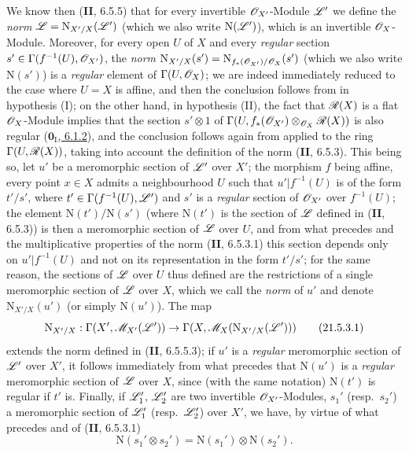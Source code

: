 \begin{env}[21.5.3]
We know then (\textbf{II}, 6.5.5) that for every invertible $\mathscr{O}_{X'}$-Module $\mathscr{L}'$ we define the \emph{norm} $\mathscr{L}=\mathrm{N}_{X'/X}(\mathscr{L}')$ (which we also write $\mathrm{N}(\mathscr{L}')$), which is an invertible $\mathscr{O}_X$-Module.
Moreover, for every open $U$ of $X$ and every \emph{regular} section $s'\in\Gamma(f^{-1}(U),\mathscr{O}_{X'})$, the \emph{norm} $\mathrm{N}_{X'/X}(s')=\mathrm{N}_{f_*(\mathscr{O}_{X'})/\mathscr{O}_X}(s')$ (which we also write $\mathrm{N}(s')$) is a \emph{regular} element of $\Gamma(U,\mathscr{O}_X)$;
we are indeed immediately reduced to the case where $U=X$ is affine, and then the conclusion follows from  in hypothesis (I);
on the other hand, in hypothesis (II), the fact that $\mathscr{R}(X)$ is a flat $\mathscr{O}_X$-Module implies that the section $s'\otimes 1$ of $\Gamma(U,f_*(\mathscr{O}_{X'})\otimes_{\mathscr{O}_X}\mathscr{R}(X))$ is also regular (\hyperref[0.6.1.2]{$\mathbf{0}_{\mathrm{I}}$, 6.1.2}), and the conclusion follows again from  applied to the ring $\Gamma(U,\mathscr{R}(X))$, taking into account the definition of the norm (\textbf{II}, 6.5.3).
This being so, let $u'$ be a meromorphic section of $\mathscr{L}'$ over $X'$;
the morphism $f$ being affine, every point $x\in X$ admits a neighbourhood $U$ such that $u'|f^{-1}(U)$ is of the form $t'/s'$, where $t'\in\Gamma(f^{-1}(U),\mathscr{L}')$ and $s'$ is a \emph{regular} section of $\mathscr{O}_{X'}$ over $f^{-1}(U)$;
the element $\mathrm{N}(t')/\mathrm{N}(s')$ (where $\mathrm{N}(t')$ is the section of $\mathscr{L}$ defined in (\textbf{II}, 6.5.3)) is then a meromorphic section of $\mathscr{L}$ over $U$, and from what precedes and the multiplicative properties of the norm (\textbf{II}, 6.5.3.1) this section depends only on $u'|f^{-1}(U)$ and not on its representation in the form $t'/s'$;
for the same reason, the sections of $\mathscr{L}$ over $U$ thus defined are the restrictions of a single meromorphic section of $\mathscr{L}$ over $X$, which we call the \emph{norm} of $u'$ and denote $\mathrm{N}_{X'/X}(u')$ (or simply $\mathrm{N}(u')$).
The map
\[
\label{IV.21.5.3.1}
  \mathrm{N}_{X'/X}:\Gamma(X',\mathscr{M}_{X'}(\mathscr{L}'))\to\Gamma(X,\mathscr{M}_X(\mathrm{N}_{X'/X}(\mathscr{L}')))
  \tag{21.5.3.1}
\]
extends the norm defined in (\textbf{II}, 6.5.5.3);
if $u'$ is a \emph{regular} meromorphic section of $\mathscr{L}'$ over $X'$, it follows immediately from what precedes that $\mathrm{N}(u')$ is a \emph{regular} meromorphic section of $\mathscr{L}$ over $X$, since (with the same notation) $\mathrm{N}(t')$ is regular if $t'$ is.
Finally, if $\mathscr{L}_1'$, $\mathscr{L}_2'$ are two invertible $\mathscr{O}_{X'}$-Modules, $s_1'$ (resp.\ $s_2'$) a meromorphic section of $\mathscr{L}_1'$ (resp.\ $\mathscr{L}_2'$) over $X'$, we have, by virtue of what precedes and of (\textbf{II}, 6.5.3.1)
\[
\label{IV.21.5.3.2}
  \mathrm{N}(s_1'\otimes s_2')=\mathrm{N}(s_1')\otimes\mathrm{N}(s_2').
  \tag{21.5.3.2}
\]
\end{env}

